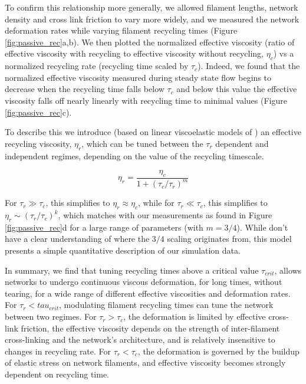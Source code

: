 \documentclass[10pt,letterpaper]{article}
\begin{document}
To confirm this relationship more generally, we allowed filament lengths, network density and cross link friction to vary more widely, and we measured the network deformation rates while varying filament recycling times (Figure \ref{fig:passive_rec}a,b). We then plotted the normalized effective viscosity (ratio of effective viscosity with recycling to effective viscosity without recycling, $\eta_c$) vs a normalized recycling rate (recycling time scaled by $\tau_c$). Indeed, we found that the normalized effective viscosity measured during steady state flow begins to decrease when the recycling time falls below $\tau_c$ and below this value the effective viscosity falls off nearly linearly with recycling time to minimal values (Figure \ref{fig:passive_rec}c). 

To describe this we introduce (based on linear viscoelastic models of \cite{mccrum1997principles}) an effective recycling viscosity, $\eta_r$, which can be tuned between the $\tau_r$ dependent and independent regimes, depending on the value of the recycling timescale.



\begin{equation}
\label{eqn:simple_eta}
\eta_r = \frac{\eta_c}{1+(\tau_c/\tau_r)^m}  
\end{equation}

For $\tau_r\gg\tau_c$, this simplifies to $\eta_r\approx\eta_c$, while for  $\tau_r\ll\tau_c$, this simplifies to $\eta_r\sim(\tau_r/\tau_c)^k$, which matches with our measurements as found in Figure \ref{fig:passive_rec}d for a large range of parameters (with $m=3/4$). While don't have a clear understanding of where the $3/4$ scaling originates from, this model presents a simple quantitative description of our simulation data.



In summary, we find that tuning recycling times above a critical value $\tau_{crit}$, allows networks to undergo continuous viscous deformation, for long times, without tearing, for a wide range of different effective viscosities and deformation rates. For $\tau_r < tau_{crit}$, modulating filament recycling times can tune the network between two regimes. For $\tau_r > \tau_c$, the deformation is limited by effective cross-link friction, the effective viscosity depends on the strength of inter-filament cross-linking and the network's architecture, and is relatively insensitive to changes in recycling rate. For $\tau_r < \tau_c$, the deformation is governed by the buildup of elastic stress on network filaments, and effective viscosity becomes strongly dependent on recycling time. 
\end{document}
